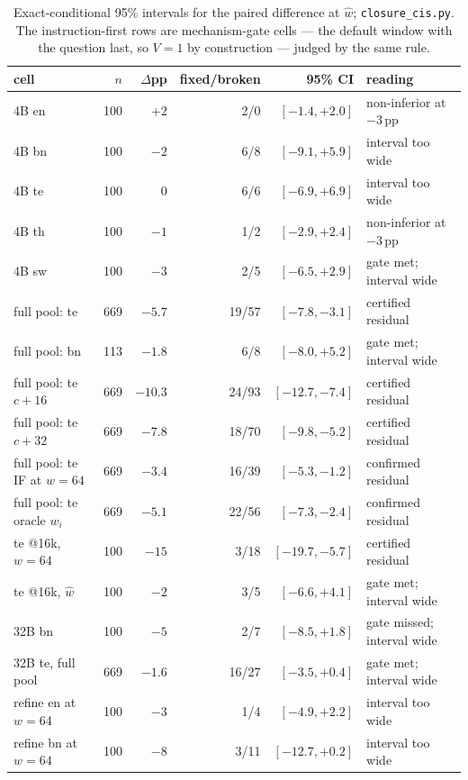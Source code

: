 \documentclass{article}
\begin{document}
\begin{table}[h]
\caption{Exact-conditional 95\% intervals for the paired difference at
$\hat w$; \texttt{closure\_cis.py}. The instruction-first rows are
mechanism-gate cells --- the default window with the question last, so
$V{=}1$ by construction --- judged by the same rule.}
\label{tab:ci}
\centering
\small
\begin{tabular}{lrrrrl}
\toprule
cell & $n$ & $\Delta$pp & fixed/broken & 95\% CI & reading \\
\midrule
4B en & 100 & ${+}2$ & 2/0 & $[-1.4, +2.0]$ & non-inferior at $-3$\,pp \\
4B bn & 100 & ${-}2$ & 6/8 & $[-9.1, +5.9]$ & interval too wide \\
4B te & 100 & $0$ & 6/6 & $[-6.9, +6.9]$ & interval too wide \\
4B th & 100 & ${-}1$ & 1/2 & $[-2.9, +2.4]$ & non-inferior at $-3$\,pp \\
4B sw & 100 & ${-}3$ & 2/5 & $[-6.5, +2.9]$ & gate met; interval wide \\
\addlinespace
full pool: te & 669 & ${-}5.7$ & 19/57 & $[-7.8, -3.1]$ & certified residual \\
full pool: bn & 113 & ${-}1.8$ & 6/8 & $[-8.0, +5.2]$ & gate met; interval wide \\
full pool: te $c{+}16$ & 669 & ${-}10.3$ & 24/93 & $[-12.7, -7.4]$ & certified residual \\
full pool: te $c{+}32$ & 669 & ${-}7.8$ & 18/70 & $[-9.8, -5.2]$ & certified residual \\
full pool: te IF at $w{=}64$ & 669 & ${-}3.4$ & 16/39 & $[-5.3, -1.2]$ & confirmed residual \\
full pool: te oracle $w_i$ & 669 & ${-}5.1$ & 22/56 & $[-7.3, -2.4]$ & confirmed residual \\
te @16k, $w{=}64$ & 100 & ${-}15$ & 3/18 & $[-19.7, -5.7]$ & certified residual \\
te @16k, $\hat w$ & 100 & ${-}2$ & 3/5 & $[-6.6, +4.1]$ & gate met; interval wide \\
32B bn & 100 & ${-}5$ & 2/7 & $[-8.5, +1.8]$ & gate missed; interval wide \\
32B te, full pool & 669 & ${-}1.6$ & 16/27 & $[-3.5, +0.4]$ & gate met; interval wide \\
refine en at $w{=}64$ & 100 & ${-}3$ & 1/4 & $[-4.9, +2.2]$ & interval too wide \\
refine bn at $w{=}64$ & 100 & ${-}8$ & 3/11 & $[-12.7, +0.2]$ & interval too wide \\

\end{tabular}
\end{table}
\end{document}
